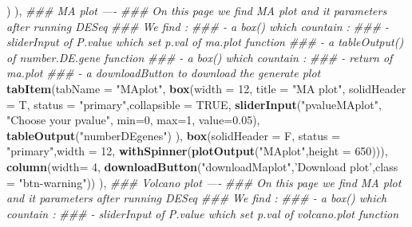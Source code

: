 \documentclass[
  12pt,
]{article}
\newenvironment{Shaded}{\begin{snugshade}}{\end{snugshade}}
\newcommand{\CommentTok}[1]{\textcolor[rgb]{0.56,0.35,0.01}{\textit{#1}}}
\newcommand{\DataTypeTok}[1]{\textcolor[rgb]{0.13,0.29,0.53}{#1}}
\newcommand{\DecValTok}[1]{\textcolor[rgb]{0.00,0.00,0.81}{#1}}
\newcommand{\FloatTok}[1]{\textcolor[rgb]{0.00,0.00,0.81}{#1}}
\newcommand{\KeywordTok}[1]{\textcolor[rgb]{0.13,0.29,0.53}{\textbf{#1}}}
\newcommand{\NormalTok}[1]{#1}
\newcommand{\OtherTok}[1]{\textcolor[rgb]{0.56,0.35,0.01}{#1}}
\newcommand{\StringTok}[1]{\textcolor[rgb]{0.31,0.60,0.02}{#1}}
\begin{document}
\begin{Shaded}
\begin{Highlighting}[]
\NormalTok{                    )}
\NormalTok{            ),}
            \CommentTok{### MA plot ----}
            \CommentTok{### On this page we find MA plot and it parameters after running DESeq}
            \CommentTok{### We find :}
            \CommentTok{###     - a box() which countain :}
            \CommentTok{###         - sliderInput of P.value which set p.val of ma.plot function}
            \CommentTok{###         - a tableOutput() of number.DE.gene function}
            \CommentTok{###     - a box() which countain :}
            \CommentTok{###         - return of ma.plot }
            \CommentTok{###     - a downloadButton to download  the generate plot}
            \KeywordTok{tabItem}\NormalTok{(}\DataTypeTok{tabName =} \StringTok{"MAplot"}\NormalTok{,}
                    \KeywordTok{box}\NormalTok{(}\DataTypeTok{width =} \DecValTok{12}\NormalTok{,}
                        \DataTypeTok{title =} \StringTok{"MA plot"}\NormalTok{, }\DataTypeTok{solidHeader =}\NormalTok{ T, }\DataTypeTok{status =} \StringTok{"primary"}\NormalTok{,}\DataTypeTok{collapsible =} \OtherTok{TRUE}\NormalTok{,}
                        \KeywordTok{sliderInput}\NormalTok{(}\StringTok{"pvalueMAplot"}\NormalTok{, }\StringTok{"Choose your pvalue"}\NormalTok{, }\DataTypeTok{min=}\DecValTok{0}\NormalTok{, }\DataTypeTok{max=}\DecValTok{1}\NormalTok{, }\DataTypeTok{value=}\FloatTok{0.05}\NormalTok{),}
                        \KeywordTok{tableOutput}\NormalTok{(}\StringTok{"numberDEgenes"}\NormalTok{)}
\NormalTok{                    ),}
                    \KeywordTok{box}\NormalTok{(}\DataTypeTok{solidHeader =}\NormalTok{ F, }\DataTypeTok{status =} \StringTok{"primary"}\NormalTok{,}\DataTypeTok{width =} \DecValTok{12}\NormalTok{,}
                        \KeywordTok{withSpinner}\NormalTok{(}\KeywordTok{plotOutput}\NormalTok{(}\StringTok{"MAplot"}\NormalTok{,}\DataTypeTok{height =} \DecValTok{650}\NormalTok{))),}
                    \KeywordTok{column}\NormalTok{(}\DataTypeTok{width=} \DecValTok{4}\NormalTok{,}
                           \KeywordTok{downloadButton}\NormalTok{(}\StringTok{"downloadMaplot"}\NormalTok{,}\StringTok{'Download plot'}\NormalTok{,}\DataTypeTok{class =} \StringTok{"btn-warning"}\NormalTok{))}
\NormalTok{            ),}
            \CommentTok{### Volcano plot ----}
            \CommentTok{### On this page we find MA plot and it parameters after running DESeq}
            \CommentTok{### We find :}
            \CommentTok{###     - a box() which countain :}
            \CommentTok{###         - sliderInput of P.value which set p.val of volcano.plot function}

\end{Highlighting}
\end{Shaded}
\end{document}
